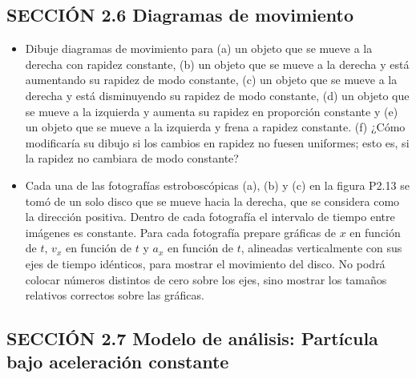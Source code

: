 \documentclass[11pt,a4paper]{article}
\begin{document}
\newpage

\subsection*{SECCIÓN 2.6 Diagramas de movimiento}

\begin{itemize}
    \item[\textbf{12.}] Dibuje diagramas de movimiento para (a) un objeto que se mueve a la derecha con rapidez constante, (b) un objeto que se mueve a la derecha y está aumentando su rapidez de modo constante, (c) un objeto que se mueve a la derecha y está disminuyendo su rapidez de modo constante, (d) un objeto que se mueve a la izquierda y aumenta su rapidez en proporción constante y (e) un objeto que se mueve a la izquierda y frena a rapidez constante. (f) ¿Cómo modificaría su dibujo si los cambios en rapidez no fuesen uniformes; esto es, si la rapidez no cambiara de modo constante?
    \vspace*{8cm}

    \item[\textbf{13.}] Cada una de las fotografías estroboscópicas (a), (b) y (c) en la figura P2.13 se tomó de un solo disco que se mueve hacia la derecha, que se considera como la dirección positiva. Dentro de cada fotografía el intervalo de tiempo entre imágenes es constante. Para cada fotografía prepare gráficas de $x$ en función de $t$, $v_x$ en función de $t$ y $a_x$ en función de $t$, alineadas verticalmente con sus ejes de tiempo idénticos, para mostrar el movimiento del disco. No podrá colocar números distintos de cero sobre los ejes, sino mostrar los tamaños relativos correctos sobre las gráficas.
    \vspace*{10cm}
\end{itemize}

\newpage

\subsection*{SECCIÓN 2.7 Modelo de análisis: Partícula bajo aceleración constante}
\end{document}
